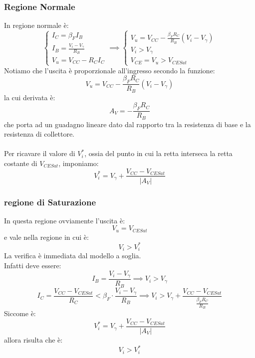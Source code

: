 \documentclass{article}
\numberwithin{equation}{subsection}
\begin{document}
	\subsubsection{Regione Normale}
	In regione normale è:
	$$\begin{cases} I_C = \beta_F I_B \\ I_B = \frac{V_i - V_\gamma}{R_B} \\ V_u = V_{CC} - R_C I_C \end{cases} \implies \begin{cases} V_u = V_{CC} - \frac{\beta_F R_C}{R_B} (V_i - V_\gamma) \\ V_i > V_\gamma \\ V_{CE} = V_u > V_{CESat} \end{cases}$$
	Notiamo che l’uscita è proporzionale all’ingresso secondo la funzione:
	$$V_u = V_{CC} - \frac{\beta_F R_C}{R_B} (V_i - V_\gamma)$$
	la cui derivata è:
	$$A_V = -\frac{\beta_F R_C}{R_B}$$
	che porta ad un guadagno lineare dato dal rapporto tra la resistenza di base e la resistenza di collettore.\\\\
	Per ricavare il valore di $V_i^*$, ossia del punto in cui la retta interseca la retta costante di $V_{CESat}$, imponiamo:
	$$V_i^* = V_\gamma + \frac{V_{CC} - V_{CESat}}{|A_V|}$$
	\subsubsection{regione di Saturazione}
	In questa regione ovviamente l’uscita è:
	$$V_u = V_{CESat}$$
	e vale nella regione in cui è:
	$$V_i > V_i^*$$
	La verifica è immediata dal modello a soglia. \\
	Infatti deve essere:
	$$I_B = \frac{V_i - V_\gamma}{R_B} \implies V_i > V_\gamma$$
	$$I_C = \frac{V_{CC} - V_{CESat}}{R_C} < \beta_F \cdot \frac{V_i - V_\gamma}{R_B} \implies V_i > V_\gamma + \frac{V_{CC} - V_{CESat}}{\frac{\beta_F R_C}{R_B}}$$
	Siccome è:
	$$V_i^* = V_\gamma + \frac{V_{CC} - V_{CESat}}{|A_V|}$$
	allora risulta che è:
	$$V_i > V_i^*$$
\end{document}
